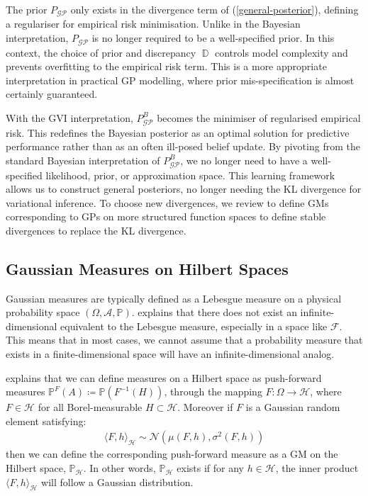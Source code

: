 \documentclass{article}
\newcommand{\D}{\operatorname{\mathbb{D}}}
\newcommand{\GP}{\operatorname{\mathcal{GP}}}
\numberwithin{equation}{section}
\begin{document}
The prior $P_{\GP}$ only exists in the divergence term of (\ref{general-posterior}), defining a regulariser for empirical risk minimisation. Unlike in the Bayesian interpretation, $P_{\GP}$ is no longer required to be a well-specified prior. In this context, the choice of prior and discrepancy $\D$ controls model complexity and prevents overfitting to the empirical risk term. This is a more appropriate interpretation in practical GP modelling, where prior mis-specification is almost certainly guaranteed.

With the GVI interpretation, $P_{\GP}^B$ becomes the minimiser of regularised empirical risk. This redefines the Bayesian posterior as an optimal solution for predictive performance rather than as an often ill-posed belief update. By pivoting from the standard Bayesian interpretation of $P_{\GP}^B$, we no longer need to have a well-specified likelihood, prior, or approximation space. This learning framework allows us to construct general posteriors, no longer needing the KL divergence for variational inference. To choose new divergences, we review \cite{wild2022generalized} to define GMs corresponding to GPs on more structured function spaces to define stable divergences to replace the KL divergence.

\subsection{Gaussian Measures on Hilbert Spaces}
Gaussian measures are typically defined as a Lebesgue measure on a physical probability space $(\Omega, \mathcal{A}, \mathbb{P})$. \cite{matthews2017scalable} explains that there does not exist an infinite-dimensional equivalent to the Lebesgue measure, especially in a space like $\mathcal{F}$. This means that in most cases, we cannot assume that a  probability measure that exists in a finite-dimensional space will have an infinite-dimensional analog.

\cite{wild2022generalized} explains that we can define measures on a Hilbert space as push-forward measures $\mathbb{P}^{F}(A) \coloneqq \mathbb{P}(F^{-1}(H))$, through the mapping $F: \Omega \rightarrow \mathcal{H}$, where $F \in \mathcal{H}$ for all Borel-measurable $H \subset \mathcal{H}$. Moreover if $F$ is a Gaussian random element satisfying:
\begin{align}
    \langle F, h \rangle_\mathcal{H} \sim \mathcal{N}\left(\mu(F, h), \sigma^2(F, h)\right)
\label{gre}
\end{align}
then we can define the corresponding push-forward measure as a GM on the Hilbert space, $\mathbb{P}_{\mathcal{H}}$. In other words, $\mathbb{P}_{\mathcal{H}}$ exists if for any $h \in \mathcal{H}$, the inner product $\langle F, h \rangle_\mathcal{H}$ will follow a Gaussian distribution. 
\end{document}
